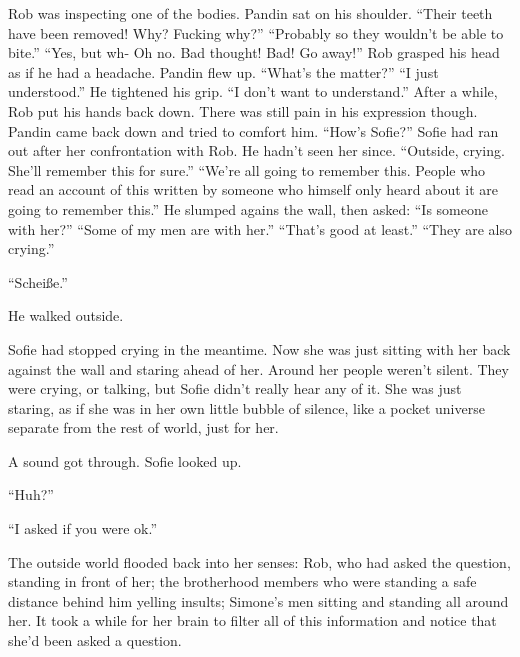 \documentclass[letterpaper,12pt]{report}
\begin{document}
Rob was inspecting one of the bodies. Pandin sat on his shoulder.
\empty
{}
{``Their teeth have been removed! Why? Fucking why?''}
{``Probably so they wouldn't be able to bite.''}
{``Yes, but wh- Oh no. Bad thought! Bad! Go away!''}
\empty
Rob grasped his head as if he had a headache. Pandin flew up.
\empty
{}
{``What's the matter?''}
{``I just understood.''}
\empty
He tightened his grip.
\empty
{}
{``I don't want to understand.''}
\empty
After a while, Rob put his hands back down. There was still pain in his expression though. Pandin came back down and tried to comfort him.
\empty
{}
{``How's Sofie?''}
\empty
Sofie had ran out after her confrontation with Rob. He hadn't seen her since.
\empty
{}
{``Outside, crying. She'll remember this for sure.''}
{``We're all going to remember this. People who read an account of this written by someone who himself only heard about it are going to remember this.''}
\empty
He slumped agains the wall, then asked:
\empty
{}
{``Is someone with her?''}
{``Some of my men are with her.''}
{``That's good at least.''}
{``They are also crying.''}
\begin{center}
``Schei{\ss}e.''
\end{center}
He walked outside.
\act

Sofie had stopped crying in the meantime. Now she was just sitting with her back against the wall and staring ahead of her. Around her people weren't silent. They were crying, or talking, but Sofie didn't really hear any of it. She was just staring, as if she was in her own little bubble of silence, like a pocket universe separate from the rest of world, just for her.

A sound got through. Sofie looked up.

``Huh?''

``I asked if you were ok.''

The outside world flooded back into her senses: Rob, who had asked the question, standing in front of her; the brotherhood members who were standing a safe distance behind him yelling insults; Simone's men sitting and standing all around her. It took a while for her brain to filter all of this information and notice that she'd been asked a question.
\end{document}
